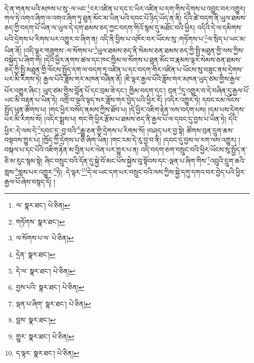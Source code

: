 དེ་ན་གནས་པའི་མཁས་པ་སུ་:ལ་ཡང་\footnote{ལ་  སྣར་ཐང་།  པེ་ཅིན། }ངར་འཛིན་པ་དང་ང་ཡིར་འཛིན་པ་དག་གིས་དྲེགས་པ་འབྱུང་བར་འགྱུར། གལ་ཏེ་འགའ་ཞིག་ལ་འགའ་ཞིག་ཏུ་ཐུན་མོང་མ་ཡིན་པའི་དབང་པོ་ཉིད་ཡོད་ན་ནི། དེའི་ཚེ་བདག་ནི་ཡུལ་ཐམས་ཅད་ཀྱི་བདག་པོ་ཡིན་ལ་ཡུལ་དེ་དག་ཐམས་ཅད་ཀྱང་བདག་གིའོ་སྙམ་དུ་མཐོང་བའི་ཕྱིར། འདིའི་དེ་ལ་དམིགས་པའི་དྲེགས་པ་རིགས་པར་འགྱུར་བ་ཞིག་ན། འདི་ནི་བྱིས་པ་འཁོར་བར་ཡོངས་སུ་:གཏོགས་པ་\footnote{གཏོགས་  སྣར་ཐང་། }ལ་སྲིད་པ་ཡང་མ་ཡིན་ནོ། །འདི་ལྟར་གཟུགས་:ལ་སོགས་པ་\footnote{ལ་སོགས་པ་ལ་  པེ་ཅིན། }ཡུལ་ཐམས་ཅད་ནི་སེམས་ཅན་ཐམས་ཅད་ཀྱི་སྤྱི་མཐུན་གྱི་ལས་ཀྱིས་བསྐྱེད་པ་ཞིག་གོ། །དེའི་ཕྱིར་ནགས་ཚལ་དང་ཁང་ཁྱིམ་ལ་སོགས་པ་ཐུན་མོང་བ་རྣམས་ལྟར་སེམས་ཅན་ཐམས་ཅད་ཀྱི་སྤྱི་མཐུན་གྱི་ལོངས་སྤྱོད་དག་ལ་བདག་ཏུ་འཛིན་པ་དང་བདག་གིར་འཛིན་པ་ཡོངས་སུ་བཟུང་ནས་དྲེགས་པར་མི་རིགས་ཏེ། རྒྱལ་པོའི་ཟློས་གར་མཁན་བཞིན་ནོ། །ཇི་ལྟར་རྒྱལ་པོའི་ཟློས་གར་མཁན་ཡུད་ཙམ་གྱིས་རྒྱལ་པོར་འགྱུར་ཞིང་། ཡུད་ཙམ་གྱིས་བློན་པོ་དང་བྲམ་ཟེ་དང་། ཁྱིམ་བདག་དང་། བྲན་\footnote{དྲེན་  སྣར་ཐང་། }དུ་འགྱུར་བ་དེ་བཞིན་དུ་རྒྱལ་པོ་ཡང་མི་བརྟན་པ་ཡིན་ཏེ། འགྲོ་བ་ལྔའི་ལྟད་སར་ཟློས་གར་བྱེད་པའི་ཕྱིར་རོ། །འདིར་འགྱུར་ཏེ། དབང་ངམ་ལོངས་སྤྱོད་ཕུན་ཚོགས་པ། །གང་ཕྱིར་བསོད་ནམས་ཀྱིས་ཐོབ་པ། །དེ་ཕྱིར་འཇིག་རྟེན་ལས་བདག་པས། །དམ་པས་དྲེགས་པར་མི་རིགས་སོ། །འདིར་སྨྲས་པ། གང་གི་ཕྱིར་རྩོམ་པ་ཐམས་ཅད་ནི་རྒྱལ་པོ་ལ་དབང་དུ་བྱས་པ་ཡིན་ཏེ། དེའི་ཕྱིར་:དེ་ལས་དེ་\footnote{དེ་ལ་  སྣར་ཐང་།  པེ་ཅིན། }དབང་དུ་:བྱ་བའི་\footnote{བྱས་པའི་  སྣར་ཐང་།  པེ་ཅིན། }རྒྱུ་ཅན་གྱི་དྲེགས་པ་རིགས་སོ། །བཤད་པར་བྱ་སྟེ། ཚོགས་བྲན་དྲུག་ཆས་བསྟབས་གྱུར་པ། །ཁྱོད་ཀྱི་དྲེགས་པ་ཅི་ཞིག་ཡིན། །གང་ངམ་དེ་རུ་བྱ་བ་ནི། །དབང་དུ་བྱས་ལ་རག་ལས་འགྱུར། །བསྐལ་པ་དང་པོའི་འཇིག་རྟེན་མ་བྱིན་པར་ལེན་པར་གྱུར་པ་ན། འདི་བདག་ཅག་བསྲུང་བའི་ཕྱིར་ཡོངས་སུ་སྤྱོད་ན་ཅི་མ་རུང་སྙམ་སྟེ། ཞིང་བསྲུང་བའི་དོན་དུ་སྐྱེ་བོ་མང་པོས་སྐྱེས་བུ་སྟོབས་དང་:ལྡན་པ་ཞིག་གིས་\footnote{ལྡན་པ་ཞིག་  སྣར་ཐང་།  པེ་ཅིན། }འབྲུའི་དྲུག་ཆའི་གླས་\footnote{བླས་  སྣར་ཐང་། }གླས་པར་འགྱུར་\footnote{གྱུར་  སྣར་ཐང་།  པེ་ཅིན། }ཏེ། :དེ་ལྟར་\footnote{ད་ལྟར་  སྣར་ཐང་།  པེ་ཅིན། }དེ་ལ་ཡང་དག་པར་བསྲུང་བའི་ལས་ཀྱིས་སྐྱེ་དགུ་དགའ་བར་བྱེད་པའི་ཕྱིར་རྒྱལ་པོ་ཞེས་བསྙད་དོ། །
